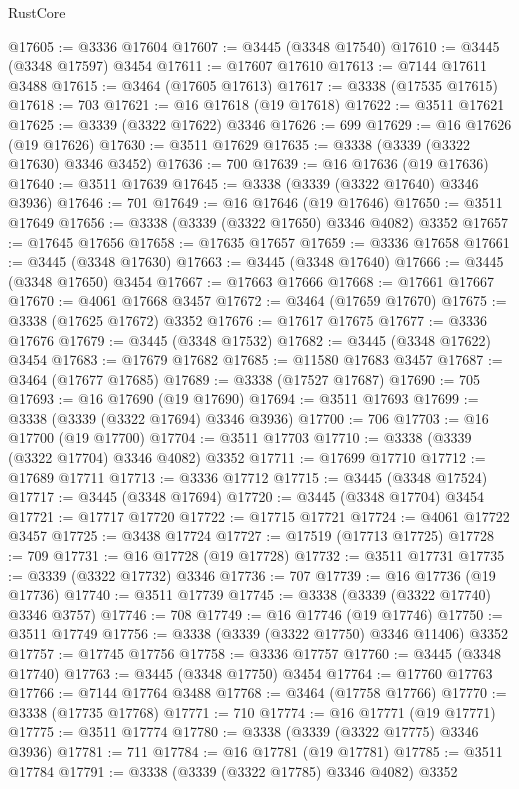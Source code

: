 \begin{lexlean}{RustCore}
\begin{coremodule}
@17605 := @3336 @17604
@17607 := @3445 (@3348 @17540)
@17610 := @3445 (@3348 @17597) @3454
@17611 := @17607 @17610
@17613 := @7144 @17611 @3488
@17615 := @3464 (@17605 @17613)
@17617 := @3338 (@17535 @17615)
@17618 := 703
@17621 := @16 @17618 (@19 @17618)
@17622 := @3511 @17621
@17625 := @3339 (@3322 @17622) @3346
@17626 := 699
@17629 := @16 @17626 (@19 @17626)
@17630 := @3511 @17629
@17635 := @3338 (@3339 (@3322 @17630) @3346 @3452)
@17636 := 700
@17639 := @16 @17636 (@19 @17636)
@17640 := @3511 @17639
@17645 := @3338 (@3339 (@3322 @17640) @3346 @3936)
@17646 := 701
@17649 := @16 @17646 (@19 @17646)
@17650 := @3511 @17649
@17656 := @3338 (@3339 (@3322 @17650) @3346 @4082) @3352
@17657 := @17645 @17656
@17658 := @17635 @17657
@17659 := @3336 @17658
@17661 := @3445 (@3348 @17630)
@17663 := @3445 (@3348 @17640)
@17666 := @3445 (@3348 @17650) @3454
@17667 := @17663 @17666
@17668 := @17661 @17667
@17670 := @4061 @17668 @3457
@17672 := @3464 (@17659 @17670)
@17675 := @3338 (@17625 @17672) @3352
@17676 := @17617 @17675
@17677 := @3336 @17676
@17679 := @3445 (@3348 @17532)
@17682 := @3445 (@3348 @17622) @3454
@17683 := @17679 @17682
@17685 := @11580 @17683 @3457
@17687 := @3464 (@17677 @17685)
@17689 := @3338 (@17527 @17687)
@17690 := 705
@17693 := @16 @17690 (@19 @17690)
@17694 := @3511 @17693
@17699 := @3338 (@3339 (@3322 @17694) @3346 @3936)
@17700 := 706
@17703 := @16 @17700 (@19 @17700)
@17704 := @3511 @17703
@17710 := @3338 (@3339 (@3322 @17704) @3346 @4082) @3352
@17711 := @17699 @17710
@17712 := @17689 @17711
@17713 := @3336 @17712
@17715 := @3445 (@3348 @17524)
@17717 := @3445 (@3348 @17694)
@17720 := @3445 (@3348 @17704) @3454
@17721 := @17717 @17720
@17722 := @17715 @17721
@17724 := @4061 @17722 @3457
@17725 := @3438 @17724
@17727 := @17519 (@17713 @17725)
@17728 := 709
@17731 := @16 @17728 (@19 @17728)
@17732 := @3511 @17731
@17735 := @3339 (@3322 @17732) @3346
@17736 := 707
@17739 := @16 @17736 (@19 @17736)
@17740 := @3511 @17739
@17745 := @3338 (@3339 (@3322 @17740) @3346 @3757)
@17746 := 708
@17749 := @16 @17746 (@19 @17746)
@17750 := @3511 @17749
@17756 := @3338 (@3339 (@3322 @17750) @3346 @11406) @3352
@17757 := @17745 @17756
@17758 := @3336 @17757
@17760 := @3445 (@3348 @17740)
@17763 := @3445 (@3348 @17750) @3454
@17764 := @17760 @17763
@17766 := @7144 @17764 @3488
@17768 := @3464 (@17758 @17766)
@17770 := @3338 (@17735 @17768)
@17771 := 710
@17774 := @16 @17771 (@19 @17771)
@17775 := @3511 @17774
@17780 := @3338 (@3339 (@3322 @17775) @3346 @3936)
@17781 := 711
@17784 := @16 @17781 (@19 @17781)
@17785 := @3511 @17784
@17791 := @3338 (@3339 (@3322 @17785) @3346 @4082) @3352

\end{coremodule}
\end{lexlean}

